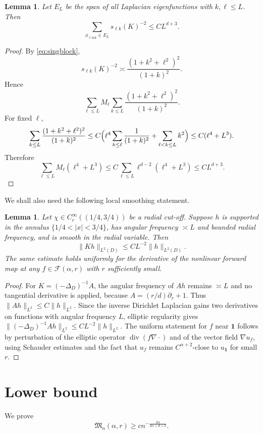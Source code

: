 \documentclass[11pt]{article}
\newcommand{\1}{\mathbf{1}}
\DeclareMathOperator{\diver}{div}
\newtheorem{lemma}[theorem]{Lemma}
\begin{document}
\begin{lemma}\label{lem:HS}
Let $E_L$ be the span of all Laplacian eigenfunctions with $k,\ell\le L$. Then
\[
\sum_{\phi_{\ell m k}\in E_L} s_{\ell k}(K)^{-2}
\le C L^{d+3}.
\]
\end{lemma}

\begin{proof}
By \eqref{eq:singblock},
\[
s_{\ell k}(K)^{-2}
\asymp
\frac{(1+k^2+\ell^2)^2}{(1+k)^2}.
\]
Hence
\[
\sum_{\ell\le L}M_\ell\sum_{k\le L}
\frac{(1+k^2+\ell^2)^2}{(1+k)^2}.
\]
For fixed $\ell$,
\[
\sum_{k\le L}\frac{(1+k^2+\ell^2)^2}{(1+k)^2}
\le
C\Bigl(
\ell^4\sum_{k\le \ell}\frac1{(1+k)^2}
+
\sum_{\ell<k\le L}k^2
\Bigr)
\le
C(\ell^4+L^3).
\]
Therefore
\[
\sum_{\ell\le L}M_\ell(\ell^4+L^3)
\le
C\sum_{\ell\le L}\ell^{d-2}(\ell^4+L^3)
\le
C L^{d+3}.
\]
\end{proof}

We shall also need the following local smoothing statement.

\begin{lemma}\label{lem:angsmooth}
Let $\chi\in C_c^\infty((1/4,3/4))$ be a radial cut-off. Suppose $h$ is supported in the annulus $\{1/4<|x|<3/4\}$, has angular frequency $\asymp L$ and bounded radial frequency, and is smooth in the radial variable. Then
\[
\|Kh\|_{L^2(D)}\le C L^{-2}\|h\|_{L^2(D)}.
\]
The same estimate holds uniformly for the derivative of the nonlinear forward map at any $f\in\mathcal F(\alpha,r)$ with $r$ sufficiently small.
\end{lemma}

\begin{proof}
For $K=(-\Delta_D)^{-1}A$, the angular frequency of $Ah$ remains $\asymp L$ and no tangential derivative is applied, because $A=(r/d)\partial_r+1$. Thus $\|Ah\|_{L^2}\le C\|h\|_{L^2}$. Since the inverse Dirichlet Laplacian gains two derivatives on functions with angular frequency $L$, elliptic regularity gives $\|(-\Delta_D)^{-1}Ah\|_{L^2}\le CL^{-2}\|h\|_{L^2}$. The uniform statement for $f$ near $\1$ follows by perturbation of the elliptic operator $\diver(f\nabla\cdot)$ and of the vector field $\nabla u_f$, using Schauder estimates and the fact that $u_f$ remains $C^{\alpha+2}$-close to $u_{\1}$ for small $r$.
\end{proof}

\section{Lower bound}

We prove
\[
\mathfrak M_n(\alpha,r)
\ge
c n^{-\frac{2\alpha}{2\alpha+d+3}}.
\]
\end{document}
